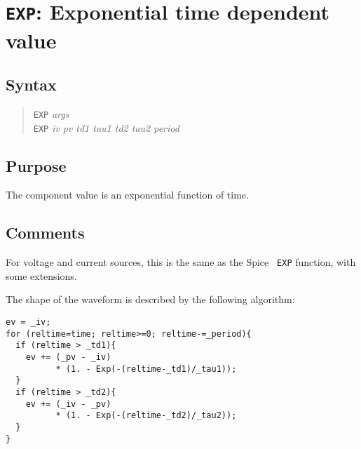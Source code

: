 %
%
%
%
\section{{\tt EXP}: Exponential time dependent value}
\subsection{Syntax}
\begin{verse}
{\tt EXP} {\it args}\\
{\tt EXP} {\it iv pv td1 tau1 td2 tau2 period}
\end{verse}
\subsection{Purpose}

The component value is an exponential function of time.
\subsection{Comments}

For voltage and current sources, this is the same as the Spice {\tt
EXP} function, with some extensions.

The shape of the waveform is described by the following algorithm:

\begin{verbatim}
ev = _iv;
for (reltime=time; reltime>=0; reltime-=_period){
  if (reltime > _td1){
    ev += (_pv - _iv) 
          * (1. - Exp(-(reltime-_td1)/_tau1));
  }
  if (reltime > _td2){
    ev += (_iv - _pv) 
          * (1. - Exp(-(reltime-_td2)/_tau2));
  }
}
\end{verbatim}
